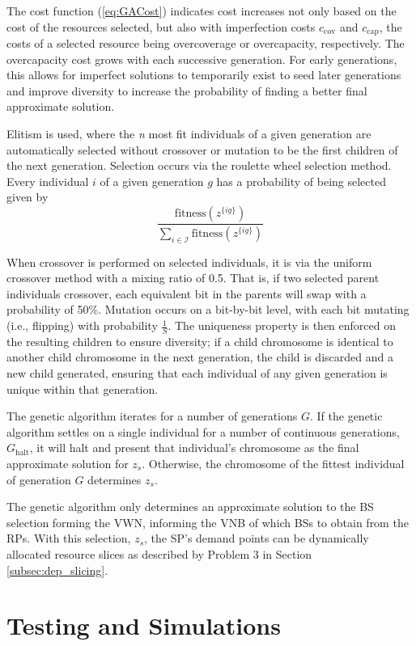 \documentclass[12pt,dvipsnames]{report}
\begin{document}
The cost function (\ref{eq:GACost}) indicates cost increases not only based on the cost of the resources selected, but also with imperfection costs $c_\text{cov}$ and $c_\text{cap}$, the costs of a selected resource being overcoverage or overcapacity, respectively.  The overcapacity cost grows with each successive generation.  For early generations, this allows for imperfect solutions to temporarily exist to seed later generations and improve diversity to increase the probability of finding a better final approximate solution.

Elitism is used, where the \textit{n} most fit individuals of a given generation are automatically selected without crossover or mutation to be the first children of the next generation.  Selection occurs via the roulette wheel selection method.  Every individual $i$ of a given generation $g$ has a probability of being selected given by
\[
\frac{\text{fitness}\left( z^{\{ig\}} \right)}{\sum_{i \in \mathcal{I}} \text{fitness}\left( z^{\{ig\}} \right)}
\]

When crossover is performed on selected individuals, it is via the uniform crossover method with a mixing ratio of 0.5.  That is, if two selected parent individuals crossover, each equivalent bit in the parents will swap with a probability of 50\%.  Mutation occurs on a bit-by-bit level, with each bit mutating (i.e., flipping) with probability $\frac{1}{S}$.  The uniqueness property is then enforced on the resulting children to ensure diversity; if a child chromosome is identical to another child chromosome in the next generation, the child is discarded and a new child generated, ensuring that each individual of any given generation is unique within that generation.

The genetic algorithm iterates for a number of generations $G$.  If the genetic algorithm settles on a single individual for a number of continuous generations, $G_\text{halt}$, it will halt and present that individual's chromosome as the final approximate solution for $z_s$.  Otherwise, the chromosome of the fittest individual of generation $G$ determines $z_s$.

The genetic algorithm only determines an approximate solution to the BS selection forming the VWN, informing the VNB of which BSs to obtain from the RPs.  With this selection, $z_s$, the SP's demand points can be dynamically allocated resource slices as described by Problem 3 in Section \ref{subsec:dep_slicing}.
\fi

\iftrue
\pagebreak
\chapter{Testing and Simulations} \label{ch:testsim}
\end{document}
